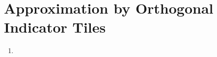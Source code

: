 \section{Approximation by Orthogonal Indicator Tiles}\label{sec:part4}

\begin{enumerate}
	\item 
\end{enumerate}